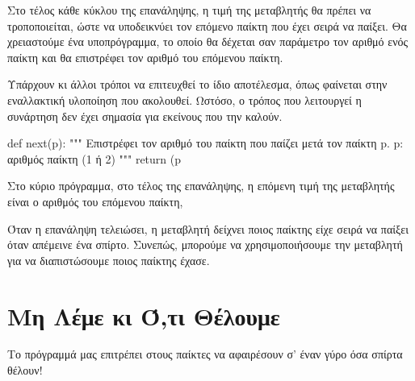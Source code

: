 \documentclass[a4paper,11pt,oneside]{book}
\begin{document}
Στο τέλος κάθε κύκλου της επανάληψης, η τιμή της μεταβλητής  θα πρέπει να τροποποιείται, ώστε να υποδεικνύει τον επόμενο παίκτη που έχει σειρά να παίξει. %
Θα χρειαστούμε ένα υποπρόγραμμα, το οποίο θα δέχεται σαν παράμετρο τον αριθμό ενός παίκτη και θα επιστρέφει τον αριθμό του επόμενου παίκτη. 


Υπάρχουν κι άλλοι τρόποι να επιτευχθεί το ίδιο αποτέλεσμα, όπως φαίνεται στην εναλλακτική υλοποίηση που ακολουθεί. Ωστόσο, ο τρόπος που λειτουργεί η συνάρτηση δεν έχει σημασία για εκείνους που την καλούν.

\begin{pycode}
def next(p):
    """ Επιστρέφει τον αριθμό του παίκτη
    που παίζει μετά τον παίκτη p.
    p: αριθμός παίκτη (1 ή 2)
    """
    return (p %
\end{pycode}

Στο κύριο πρόγραμμα, στο τέλος της επανάληψης, η επόμενη τιμή της μεταβλητής  είναι ο αριθμός του επόμενου παίκτη, %


Όταν η επανάληψη τελειώσει, η μεταβλητή  δείχνει ποιος παίκτης είχε σειρά να παίξει όταν απέμεινε ένα σπίρτο. Συνεπώς, μπορούμε να χρησιμοποιήσουμε την μεταβλητή  για να διαπιστώσουμε ποιος παίκτης έχασε.



\section{Μη Λέμε κι Ό,τι Θέλουμε}

\begin{question}
Το πρόγραμμά μας επιτρέπει στους παίκτες να αφαιρέσουν σ' έναν γύρο όσα σπίρτα θέλουν! 
\end{question}
\end{document}
